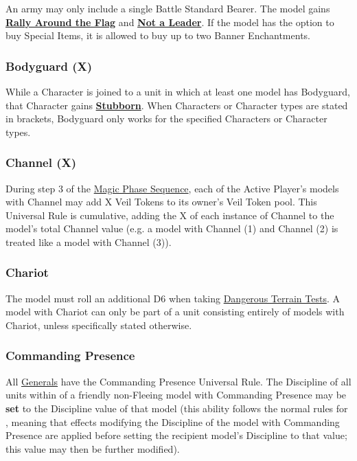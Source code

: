 An army may only include a single Battle Standard Bearer. The model gains \hyperref[rally_around_the_flag]{\textbf{Rally Around the Flag}} and \hyperref[not_a_leader]{\textbf{Not a Leader}}. If the model has the option to buy Special Items, it is allowed to buy up to two Banner Enchantments.

\subsubsection{Bodyguard (X)}
\idx[main=y]{\bodyguard{}}\label{bodyguard}

While a Character is joined to a unit in which at least one model has Bodyguard, that Character gains \hyperref[stubborn]{\textbf{Stubborn}}. When Characters or Character types are stated in brackets, Bodyguard only works for the specified Characters or Character types.

\subsubsection{Channel (X)}
\idx[main=y]{\channel{}}\label{channel}

During step 3 of the \hyperref[magic_phase_sequence]{Magic Phase Sequence}, each of the Active Player's models with Channel may add X Veil Tokens to its owner's Veil Token pool. This Universal Rule is cumulative, adding the X of each instance of Channel to the model's total Channel value (e.g. a model with Channel (1) and Channel (2) is treated like a model with Channel (3)).

\subsubsection{Chariot}
\idx[main=y]{\chariot}\label{chariot}

The model must roll an additional D6 when taking \hyperref[dangerous_terrain]{Dangerous Terrain Tests}. A model with Chariot can only be part of a unit consisting entirely of models with Chariot, unless specifically stated otherwise.

\subsubsection{Commanding Presence}
\idx[main=y]{\commandingpresence}\label{commanding_presence}

All \hyperref[the_general]{Generals} have the Commanding Presence Universal Rule. The Discipline of all units within  of a friendly non-Fleeing model with Commanding Presence may be \textbf{set} to the Discipline value of that model (this ability follows the normal rules for , meaning that effects modifying the Discipline of the model with Commanding Presence are applied before setting the recipient model's Discipline to that value; this value may then be further modified).

